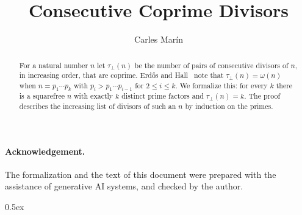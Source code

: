 \documentclass[10pt,a4paper]{article}
\begin{document}
\title{Consecutive Coprime Divisors}
\author{Carles Mar\'in}
\maketitle

\begin{abstract}
For a natural number $n$ let $\tau_\perp(n)$ be the number of pairs of consecutive divisors of $n$, in increasing order, that are
coprime. Erd\H{o}s and Hall~\cite{ErdosHall1978} note that $\tau_\perp(n)=\omega(n)$ when $n=p_1\cdots p_k$ with
$p_i>p_1\cdots p_{i-1}$ for $2\le i\le k$. We formalize this: for every $k$ there is a squarefree $n$ with exactly $k$ distinct prime
factors and $\tau_\perp(n)=k$. The proof describes the increasing list of divisors of such an $n$ by induction on the primes.
\end{abstract}

\paragraph{Acknowledgement.} The formalization and the text of this document were prepared with the
assistance of generative AI systems, and checked by the author.

\tableofcontents

\parindent 0pt\parskip 0.5ex





\end{document}
